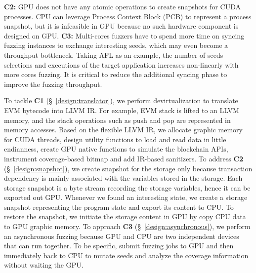 %
\textbf{C2:} 
GPU does not have any atomic operations to create snapshots for CUDA processes. 
CPU can leverage Process Context Block (PCB) to represent a process snapshot, but it is infeasible in GPU because no such hardware component is designed on GPU.
%
\textbf{C3:} 
Multi-cores fuzzers have to spend more time on syncing fuzzing instances to exchange interesting seeds, which may even become a throughput bottleneck.
Taking AFL as an example, the number of seeds selections and executions of the target application increases non-linearly with more cores fuzzing\cite{xu2017designing}. 
It is critical to reduce the additional syncing phase to improve the fuzzing throughput.



To tackle \textbf{C1} (\S~\ref{design:translator}), we perform devirtualization to translate EVM bytecode into LLVM IR. For example, EVM stack is lifted to an LLVM memory, and the stack operations such as push and pop are represented in memory accesses. Based on the flexible LLVM IR, we allocate graphic memory for CUDA threads, design utility functions to load and read data in little endianness, create GPU native functions to simulate the blockchain APIs, instrument coverage-based bitmap and add IR-based sanitizers.
%
To address \textbf{C2} (\S~\ref{design:snapshot}), we create snapshot for the storage only because transaction dependency is mainly associated with the variables stored in the storage. 
Each storage snapshot is a byte stream recording the storage variables, hence it can be exported out GPU. 
Whenever we found an interesting state, we create a storage snapshot representing the program state and export its content to CPU. To restore the snapshot, we initiate the storage content in GPU by copy CPU data to GPU graphic memory.
%
To approach \textbf{C3} (\S~\ref{design:asynchronous}), we perform an asynchronous fuzzing because GPU and CPU are two independent devices that can run together. 
To be specific, {\tool} submit fuzzing jobs to GPU and then immediately back to CPU to mutate seeds and analyze the coverage information without waiting the GPU. 


